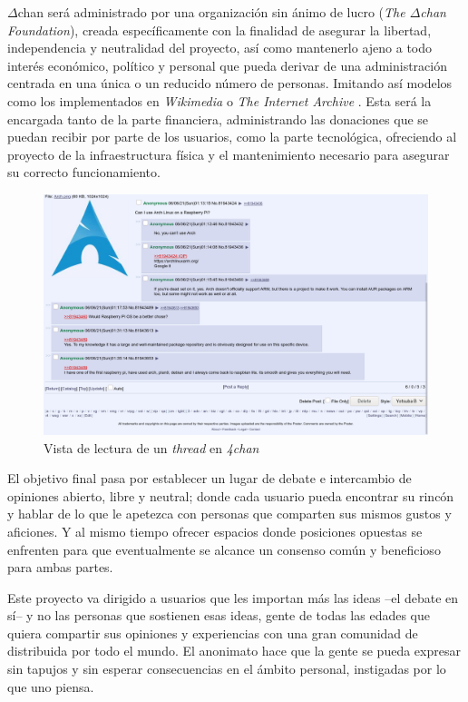 \documentclass[12pt,a4paper,titlepage]{article}
\newcommand\projectname{$\Delta$chan}
\begin{document}
    {\projectname} será administrado por una organización sin ánimo de lucro (\textit{The {\projectname} Foundation}), creada específicamente con la finalidad de asegurar la libertad, independencia y neutralidad del proyecto, así como mantenerlo ajeno a todo interés económico, político y personal que pueda derivar de una administración centrada en una única o un reducido número de personas. Imitando así modelos como los implementados en \emph{Wikimedia} \cite{wikimedia:about} o \emph{The Internet Archive} \cite{internetarchive:about}. Esta será la encargada tanto de la parte financiera, administrando las donaciones que se puedan recibir por parte de los usuarios, como la parte tecnológica, ofreciendo al proyecto de la infraestructura física y el mantenimiento necesario para asegurar su correcto funcionamiento.
    
    \begin{figure}[ht]
        \centering
        \caption{Vista de lectura de un \textit{thread} en \textit{4chan}}\bigskip
        \label{4chan:thread}
        \includegraphics[width=1.0\textwidth]{media/4chan-thread.png}
    \end{figure}

    El objetivo final pasa por establecer un lugar de debate e intercambio de opiniones abierto, libre y neutral; donde cada usuario pueda encontrar su rincón y hablar de lo que le apetezca con personas que comparten sus mismos gustos y aficiones. Y al mismo tiempo ofrecer espacios donde posiciones opuestas se enfrenten para que eventualmente se alcance un consenso común y beneficioso para ambas partes.
    
    Este proyecto va dirigido a usuarios que les importan más las ideas --el debate en sí-- y no las personas que sostienen esas ideas, gente de todas las edades que quiera compartir sus opiniones y experiencias con una gran comunidad de distribuida por todo el mundo. El anonimato hace que la gente se pueda expresar sin tapujos y sin esperar consecuencias en el ámbito personal, instigadas por lo que uno piensa.
\end{document}
